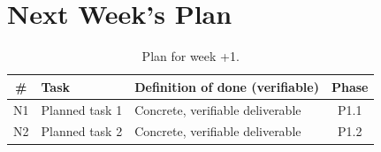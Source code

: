 \section{Next Week's Plan}

\begin{table}[H]
\centering
\caption{Plan for week \number\numexpr\WeekNo+1\relax.}
\label{tab:next}
\small
\begin{tabularx}{\textwidth}{@{}c L L c@{}}
\toprule
\textbf{\#} & \textbf{Task} & \textbf{Definition of done (verifiable)} & \textbf{Phase} \\
\midrule
N1 & Planned task 1 & Concrete, verifiable deliverable & P1.1 \\
N2 & Planned task 2 & Concrete, verifiable deliverable & P1.2 \\
\bottomrule
\end{tabularx}
\end{table}
